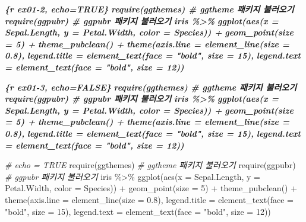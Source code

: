 \documentclass[
  11pt,
]{krantz}
\newenvironment{Shaded}{\begin{snugshade}}{\end{snugshade}}
\newcommand{\AttributeTok}[1]{\textcolor[rgb]{0.61,0.61,0.61}{#1}}
\newcommand{\CommentTok}[1]{\textcolor[rgb]{0.37,0.37,0.37}{\textit{#1}}}
\newcommand{\DecValTok}[1]{\textcolor[rgb]{0.06,0.06,0.06}{#1}}
\newcommand{\FloatTok}[1]{\textcolor[rgb]{0.06,0.06,0.06}{#1}}
\newcommand{\FunctionTok}[1]{\textcolor[rgb]{0,0,0}{#1}}
\newcommand{\InformationTok}[1]{\textcolor[rgb]{0.37,0.37,0.37}{\textbf{\textit{#1}}}}
\newcommand{\NormalTok}[1]{#1}
\newcommand{\SpecialCharTok}[1]{\textcolor[rgb]{0,0,0}{#1}}
\newcommand{\StringTok}[1]{\textcolor[rgb]{0.5,0.5,0.5}{#1}}
\begin{document}
\begin{Shaded}
\begin{Highlighting}[]
\InformationTok{\textasciigrave{}\textasciigrave{}\textasciigrave{}\{r ex01{-}2, echo=TRUE\}}
\InformationTok{require(ggthemes) \# ggtheme 패키지 불러오기}
\InformationTok{require(ggpubr) \# ggpubr 패키지 불러오기}
\InformationTok{iris \%\textgreater{}\%}
\InformationTok{   ggplot(aes(x = Sepal.Length, y = Petal.Width, color = Species)) +}
\InformationTok{   geom\_point(size = 5) +}
\InformationTok{   theme\_pubclean() +}
\InformationTok{   theme(axis.line = element\_line(size = 0.8),}
\InformationTok{         legend.title = element\_text(face = "bold", size = 15),}
\InformationTok{         legend.text = element\_text(face = "bold", size = 12))}

\InformationTok{\textasciigrave{}\textasciigrave{}\textasciigrave{}}


\InformationTok{\textasciigrave{}\textasciigrave{}\textasciigrave{}\{r ex01{-}3, echo=FALSE\}}
\InformationTok{require(ggthemes) \# ggtheme 패키지 불러오기}
\InformationTok{require(ggpubr) \# ggpubr 패키지 불러오기}
\InformationTok{iris \%\textgreater{}\%}
\InformationTok{   ggplot(aes(x = Sepal.Length, y = Petal.Width, color = Species)) +}
\InformationTok{   geom\_point(size = 5) +}
\InformationTok{   theme\_pubclean() +}
\InformationTok{   theme(axis.line = element\_line(size = 0.8),}
\InformationTok{         legend.title = element\_text(face = "bold", size = 15),}
\InformationTok{         legend.text = element\_text(face = "bold", size = 12))}

\InformationTok{\textasciigrave{}\textasciigrave{}\textasciigrave{}}
\end{Highlighting}
\end{Shaded}

\footnotesize

\begin{Shaded}
\begin{Highlighting}[]
\CommentTok{\# echo = TRUE}
\FunctionTok{require}\NormalTok{(ggthemes) }\CommentTok{\# ggtheme 패키지 불러오기}
\FunctionTok{require}\NormalTok{(ggpubr) }\CommentTok{\# ggpubr 패키지 불러오기}
\NormalTok{iris }\SpecialCharTok{\%\textgreater{}\%}
   \FunctionTok{ggplot}\NormalTok{(}\FunctionTok{aes}\NormalTok{(}\AttributeTok{x =}\NormalTok{ Sepal.Length, }\AttributeTok{y =}\NormalTok{ Petal.Width, }\AttributeTok{color =}\NormalTok{ Species)) }\SpecialCharTok{+}
   \FunctionTok{geom\_point}\NormalTok{(}\AttributeTok{size =} \DecValTok{5}\NormalTok{) }\SpecialCharTok{+}
   \FunctionTok{theme\_pubclean}\NormalTok{() }\SpecialCharTok{+}
   \FunctionTok{theme}\NormalTok{(}\AttributeTok{axis.line =} \FunctionTok{element\_line}\NormalTok{(}\AttributeTok{size =} \FloatTok{0.8}\NormalTok{),}
         \AttributeTok{legend.title =} \FunctionTok{element\_text}\NormalTok{(}\AttributeTok{face =} \StringTok{"bold"}\NormalTok{, }\AttributeTok{size =} \DecValTok{15}\NormalTok{),}
         \AttributeTok{legend.text =} \FunctionTok{element\_text}\NormalTok{(}\AttributeTok{face =} \StringTok{"bold"}\NormalTok{, }\AttributeTok{size =} \DecValTok{12}\NormalTok{))}
\end{Highlighting}
\end{Shaded}
\end{document}
